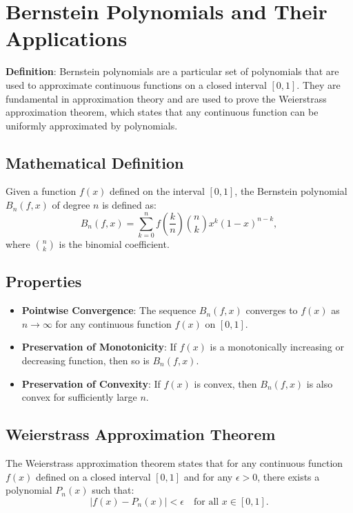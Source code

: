 \documentclass[12pt]{report} %
\begin{document}
\section{Bernstein Polynomials and Their Applications}

\textbf{Definition}: Bernstein polynomials are a particular set of polynomials that are used to approximate continuous functions on a closed interval \( [0, 1] \). They are fundamental in approximation theory and are used to prove the Weierstrass approximation theorem, which states that any continuous function can be uniformly approximated by polynomials.

\subsection{Mathematical Definition}
Given a function \( f(x) \) defined on the interval \( [0, 1] \), the Bernstein polynomial \( B_n(f, x) \) of degree \( n \) is defined as:
\[
B_n(f, x) = \sum_{k=0}^{n} f\left( \frac{k}{n} \right) \binom{n}{k} x^k (1 - x)^{n-k},
\]
where \( \binom{n}{k} \) is the binomial coefficient.

\subsection{Properties}
\begin{itemize}
    \item \textbf{Pointwise Convergence}: The sequence \( B_n(f, x) \) converges to \( f(x) \) as \( n \to \infty \) for any continuous function \( f(x) \) on \( [0, 1] \).
    \item \textbf{Preservation of Monotonicity}: If \( f(x) \) is a monotonically increasing or decreasing function, then so is \( B_n(f, x) \).
    \item \textbf{Preservation of Convexity}: If \( f(x) \) is convex, then \( B_n(f, x) \) is also convex for sufficiently large \( n \).
\end{itemize}

\subsection{Weierstrass Approximation Theorem}
The Weierstrass approximation theorem states that for any continuous function \( f(x) \) defined on a closed interval \( [0, 1] \) and for any \( \epsilon > 0 \), there exists a polynomial \( P_n(x) \) such that:
\[
|f(x) - P_n(x)| < \epsilon \quad \text{for all } x \in [0, 1].
\]
\end{document}

